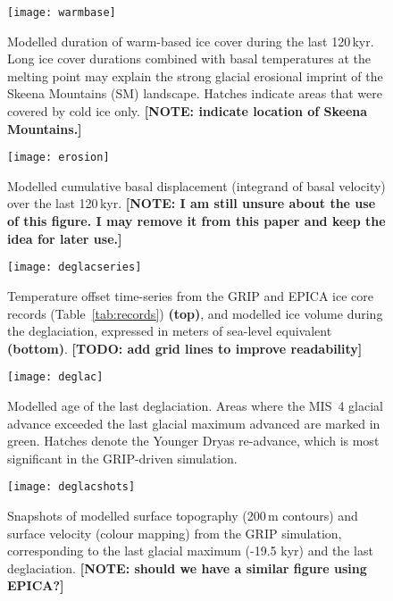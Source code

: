 \documentclass[tc, ms]{copernicus}
\newcommand{\note}[1]{\textbf{[NOTE: #1]}}
\newcommand{\todo}[1]{\textbf{[TODO: #1]}}
\begin{document}
\begin{figure}
  \texttt{[image: warmbase]}
  \caption{Modelled duration of warm-based ice cover during the last
           120\,\unit{kyr}. Long ice cover durations combined with basal
           temperatures at the melting point may explain the strong glacial
           erosional imprint of the Skeena Mountains (SM) landscape. Hatches
           indicate areas that were covered by cold ice only.
           \note{indicate location of Skeena Mountains.}}
  \label{fig:warmbase}
\end{figure}

\begin{figure}
  \texttt{[image: erosion]}
  \caption{Modelled cumulative basal displacement (integrand of basal velocity)
           over the last 120\,\unit{kyr}.
           \note{I am still unsure about the use of this figure. I may
                 remove it from this paper and keep the idea for later use.}}
  \label{fig:erosion}
\end{figure}

\begin{figure}
  \texttt{[image: deglacseries]}
  \caption{Temperature offset time-series from the GRIP and EPICA ice core
           records (Table~\ref{tab:records}) \textbf{(top)}, and modelled ice
           volume during the deglaciation, expressed in meters of sea-level
           equivalent \textbf{(bottom)}.
           \todo{add grid lines to improve readability}}
  \label{fig:deglacseries}
\end{figure}

\begin{figure}
  \texttt{[image: deglac]}
  \caption{Modelled age of the last deglaciation. Areas where the MIS~4 glacial
           advance exceeded the last glacial maximum advanced are marked in
           green. Hatches denote the Younger Dryas re-advance, which is most
           significant in the GRIP-driven simulation.}
  \label{fig:deglac}
\end{figure}

\begin{figure}
  \texttt{[image: deglacshots]}
  \caption{Snapshots of modelled surface topography (200\,\unit{m} contours)
           and surface velocity (colour mapping) from the GRIP simulation,
           corresponding to the last glacial maximum (-19.5 kyr) and the last
           deglaciation.
           \note{should we have a similar figure using EPICA?}}
  \label{fig:deglacshots}
\end{figure}
\end{document}
